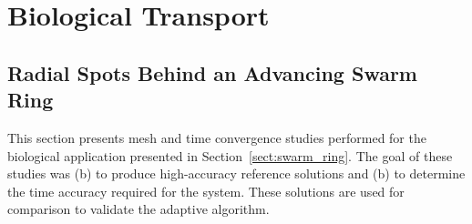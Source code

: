 \chapter{Biological Transport \label{app:bio}}


\section{Radial Spots Behind an Advancing Swarm Ring}
This section presents mesh and time convergence studies performed for the biological application presented in Section~\ref{sect:swarm_ring}.  The goal of these studies was (b) to produce high-accuracy reference solutions and (b) to determine the time accuracy required for the system.  These solutions are used for comparison to validate the adaptive algorithm.

\clearpage
